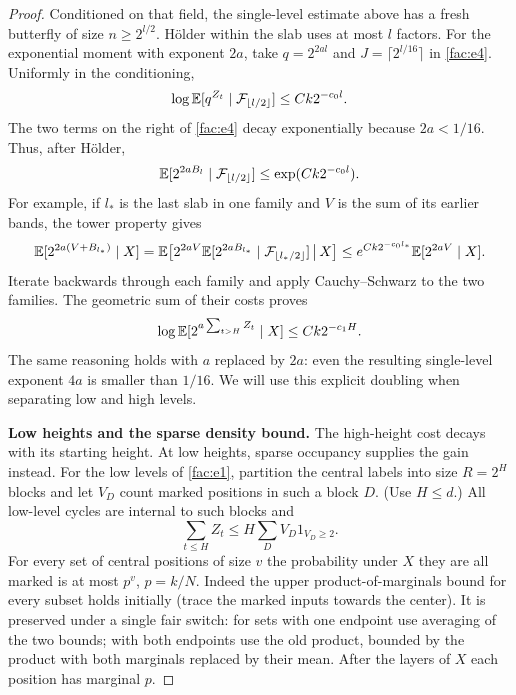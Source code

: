 \begin{proof}
Conditioned on that field, the single-level estimate above has a fresh
butterfly of size $n\ge2^{l/2}$. H\"older within the slab uses at most
$l$ factors. For the exponential moment with exponent $2a$, take
$q=2^{2al}$ and $J=\lceil2^{l/16}\rceil$ in \eqref{fac:e4}. Uniformly in
the conditioning,
\begin{equation}
\log\mathbb E[q^{Z_t}\mid\mathcal F_{\lfloor l/2\rfloor}]
 \le Ck2^{-c_0l}.
\label{fac:e5}
\end{equation}
The two terms on the right of \eqref{fac:e4} decay exponentially because
$2a<1/16$. Thus, after H\"older,
\[
 \mathbb E[2^{2aB_l}\mid\mathcal F_{\lfloor l/2\rfloor}]
 \le\exp(Ck2^{-c_0l}).
\]
For example, if $l_*$ is the last slab in one family and $V$ is the sum
of its earlier bands, the tower property gives
\[
 \mathbb E[2^{2a(V+B_{l_*})}\mid X]
 =\mathbb E\!\left[2^{2aV}
   \mathbb E[2^{2aB_{l_*}}\mid\mathcal F_{\lfloor l_*/2\rfloor}]
   \,\middle|\,X\right]
 \le e^{Ck2^{-c_0l_*}}\mathbb E[2^{2aV}\mid X].
\]
Iterate backwards through each family and apply Cauchy--Schwarz to the
two families. The geometric sum of their costs proves
\begin{equation}
\log\mathbb E[2^{a\sum_{t>H}Z_t}\mid X]\le Ck2^{-c_1H}.
\label{fac:e6}
\end{equation}
The same reasoning holds with $a$ replaced by $2a$: even the resulting
single-level exponent $4a$ is smaller than $1/16$. We will use this
explicit doubling when separating low and high levels.

\medskip\noindent\textbf{Low heights and the sparse density bound.}\enspace
The high-height cost decays with its starting height. At low heights, sparse occupancy supplies the gain instead. For the low levels of \eqref{fac:e1}, partition the central labels into size $R=2^H$ blocks and let $V_D$ count marked positions in such a block $D$. (Use $H\le d$.) All low-level cycles are internal to such blocks and
\[
\sum_{t\le H} Z_t\le H\sum_D V_D 1_{V_D\ge2}.
\]
For every set of central positions of size $v$ the probability under $X$ they are all marked is at most $p^v$, $p=k/N$. Indeed the upper product-of-marginals bound for every subset holds initially (trace the marked inputs towards the center). It is preserved under a single fair switch: for sets with one endpoint use averaging of the two bounds; with both endpoints use the old product, bounded by the product with both marginals replaced by their mean. After the layers of $X$ each position has marginal $p$.


\end{proof}
